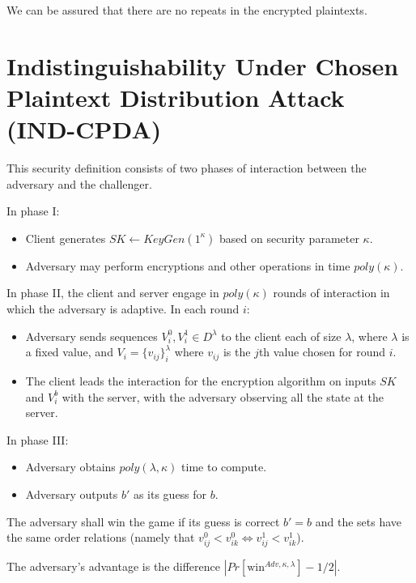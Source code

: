 \documentclass[12pt]{article}
\newenvironment{definition}[1][Definition]{\begin{trivlist}
\item[\hskip \labelsep {\bfseries #1}]}{\end{trivlist}}
\begin{document}
  We can be assured that there are no repeats in the encrypted plaintexts.



\section{Indistinguishability Under Chosen Plaintext Distribution Attack (IND-CPDA)}

This security definition consists of two phases of interaction between the adversary and the challenger.

In phase I:
\begin{itemize}
  \item Client generates $SK \leftarrow KeyGen(1^\kappa)$ based on security parameter $\kappa$.
  \item Adversary may perform encryptions and other operations in time $poly(\kappa)$.
\end{itemize}

In phase II, the client and server engage in $poly(\kappa)$ rounds of interaction in which the adversary is adaptive. In each round $i$:
\begin{itemize}
  \item Adversary sends sequences $V_i^0, V_i^1 \in D^{\lambda}$ to the client each of size $\lambda$, where $\lambda$ is a fixed value, and $V_i = \{ v_{ij} \}_i^{\lambda}$ where $v_{ij}$ is the $j$th value chosen for round $i$.
  \item The client leads the interaction for the encryption algorithm on inputs $SK$ and $V_i^b$ with the server, with the adversary observing all the state at the server.
\end{itemize}

In phase III:
\begin{itemize}
  \item Adversary obtains $poly(\lambda, \kappa)$ time to compute.
  \item Adversary outputs $b'$ as its guess for $b$. 
\end{itemize}

The adversary shall win the game if its guess is correct $b' = b$ and the sets have the same order relations (namely that $v_{ij}^0 < v_{ik}^0 \Leftrightarrow v_{ij}^1 < v_{ik}^1$).

\begin{definition}
  The adversary's advantage is the difference $|Pr[\textrm{win}^{Adv, \kappa, \lambda}] - 1/2|$.
\end{definition}
\end{document}
